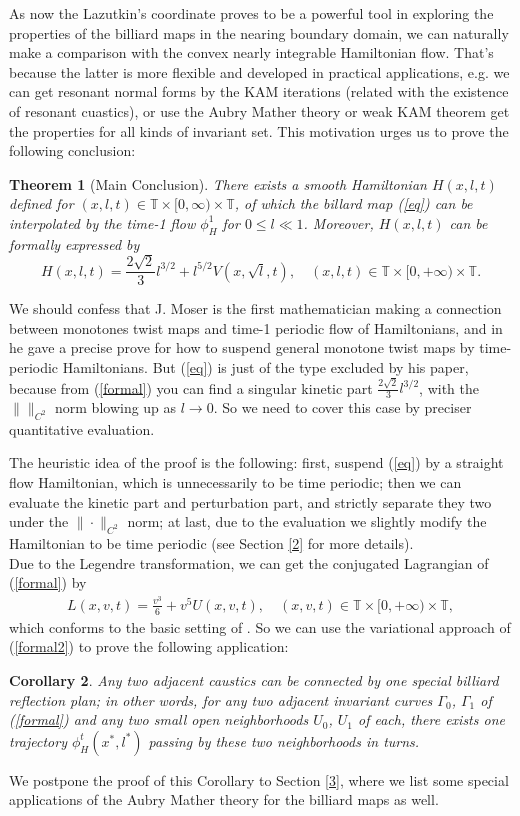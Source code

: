 \documentclass{amsart}
\newtheorem{thm}{Theorem}[section]
\newtheorem{cor}[thm]{Corollary}
\begin{document}
As now the Lazutkin's coordinate proves to be a powerful tool in exploring the properties of the billiard maps in the nearing boundary domain, we can naturally make a comparison with the convex nearly integrable Hamiltonian flow. That's because the latter is more flexible and developed in practical applications, e.g. we can get resonant normal forms by the KAM iterations (related with the existence of resonant cuastics), or use the Aubry Mather theory or weak KAM theorem get the properties for all kinds of invariant set. This motivation urges us to prove the following conclusion: 
\begin{thm}[Main Conclusion]
There exists a smooth Hamiltonian $H(x,l,t)$ defined for $(x,l,t)\in{\mathbb{T}}\times[0,\infty)\times{\mathbb{T}}$, of which the billard map (\ref{eq}) can be interpolated by the time-1 flow $\phi_H^1$ for $0\leq l\ll1$. Moreover, $H(x,l,t)$ can be formally expressed by
\begin{equation}\label{formal}
H(x,l,t)=\frac{2\sqrt{2}}{3}l^{3/2}+l^{5/2}V(x,\sqrt{l}, t),\quad(x,l,t)\in{\mathbb{T}}\times[0,+\infty)\times{\mathbb{T}}.
\end{equation}
\end{thm}
We should confess that J. Moser is the first mathematician making a connection between monotones twist maps and time-1 periodic flow of Hamiltonians, and in \cite{M} he gave a precise prove for how to suspend  general monotone twist maps by time-periodic Hamiltonians. But (\ref{eq}) is just of the type excluded by his paper, because from (\ref{formal}) you can find a singular kinetic part $\frac{2\sqrt{2}}{3}l^{3/2}$, with the $\|\|_{C^2}$ norm blowing up as $l\rightarrow0$. So we need to cover this case by preciser quantitative evaluation.

The heuristic idea of the proof is the following: first, suspend (\ref{eq}) by a straight flow Hamiltonian, which is unnecessarily to be time periodic; then we can evaluate the kinetic part and perturbation part, and strictly separate they two under the $\|\cdot\|_{C^2}$ norm; at last, due to the evaluation we slightly modify the Hamiltonian to be time periodic (see Section \ref{2} for more details).\\

Due to the Legendre transformation, we can get the conjugated Lagrangian of (\ref{formal}) by
\begin{eqnarray}\label{formal2}
L(x,v,t)=\frac{v^3}{6}+v^5U(x,v,t),\quad (x,v,t)\in{\mathbb{T}}\times[0,+\infty)\times{\mathbb{T}},
\end{eqnarray}
which conforms to the basic setting of \cite{Ma2}. So we can use the variational approach of (\ref{formal2}) to prove the following application:
\begin{cor}\label{cor}
Any two adjacent caustics can be connected by one special billiard reflection plan; in other words, for any two adjacent invariant curves $\Gamma_0$, $\Gamma_1$ of (\ref{formal}) and any two small open neighborhoods $U_0$, $U_1$ of each, there exists one trajectory $\phi_H^t(x^*,l^*)$ passing by these two neighborhoods in turns.
\end{cor}
We postpone the proof of this Corollary to Section \ref{3}, where we list some special applications of the Aubry Mather theory for the billiard maps as well.
\end{document}
